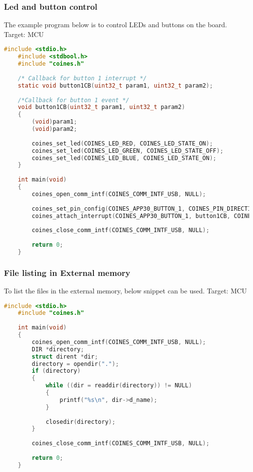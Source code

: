 \documentclass{article}
\begin{document}
\subsubsection{Led and button control}
The example program below is to control LEDs and buttons on the board.
\newline Target: MCU
\begin{lstlisting}[language=c]
	#include <stdio.h>
	#include <stdbool.h>
	#include "coines.h"
	
	/* Callback for button 1 interrupt */
	static void button1CB(uint32_t param1, uint32_t param2);
	
	/*Callback for button 1 event */
	void button1CB(uint32_t param1, uint32_t param2)
	{
		(void)param1;
		(void)param2;
	
		coines_set_led(COINES_LED_RED, COINES_LED_STATE_ON);
		coines_set_led(COINES_LED_GREEN, COINES_LED_STATE_OFF);
		coines_set_led(COINES_LED_BLUE, COINES_LED_STATE_ON);
	}
	
	int main(void)
	{
		coines_open_comm_intf(COINES_COMM_INTF_USB, NULL);
	
		coines_set_pin_config(COINES_APP30_BUTTON_1, COINES_PIN_DIRECTION_IN, COINES_PIN_VALUE_HIGH);
		coines_attach_interrupt(COINES_APP30_BUTTON_1, button1CB, COINES_PIN_INTERRUPT_FALLING_EDGE);
	
		coines_close_comm_intf(COINES_COMM_INTF_USB, NULL);
	
		return 0;
	}
\end{lstlisting}

\subsubsection{File listing in External memory}
To list the files in the external memory, below snippet can be used.
\newline Target: MCU
\begin{lstlisting}[language=c]
	#include <stdio.h>
	#include "coines.h"
	
	int main(void)
	{
		coines_open_comm_intf(COINES_COMM_INTF_USB, NULL);
		DIR *directory;
		struct dirent *dir;
		directory = opendir(".");
		if (directory)
		{
			while ((dir = readdir(directory)) != NULL)
			{
				printf("%s\n", dir->d_name);
			}
	
			closedir(directory);
		}
	
		coines_close_comm_intf(COINES_COMM_INTF_USB, NULL);
	
		return 0;
	}
\end{lstlisting}
\end{document}
